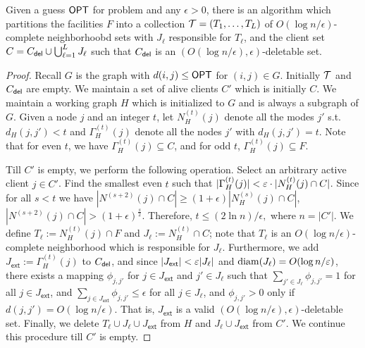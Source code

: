 \begin{theorem}\label{thm:weakdecomp}
	Given a guess $\mathsf{OPT}$ for \mckc problem and any $\epsilon>0$,  there is an algorithm which partitions the facilities $F$ into a collection ${\cal T} = (T_1,\ldots,T_L)$ of
	$O(\log n/\epsilon)$-complete neighborhoobd sets with $J_\ell$ responsible for $T_\ell$, and the client set $C = C_{\mathsf{del}} \cup \bigcup_{\ell=1}^L J_\ell$ such that
	$C_{\mathsf{del}}$ is an $(O(\log n/\epsilon),\epsilon)$-deletable set.
\end{theorem}
\begin{proof}
Recall $G$ is the graph with $d(i,j) \leq \mathsf{OPT}$ for $(i,j)\in G$. %
	Initially ${\cal T}$ and $C_{\mathsf{del}}$ are empty. We maintain a set of alive clients $C'$ which is initially $C$. We maintain a working graph $H$ which is initialized to $G$ and is always a subgraph of $G$.
	Given a node $j$ and an integer $t$, let $N^{(t)}_H(j)$ denote all the modes $j'$ s.t. $d_H(j,j') < t$ and $\Gamma^{(t)}_H(j)$ denote all the nodes $j'$ with $d_H(j,j')  = t$. 
	Note that for even $t$, we have $\Gamma^{(t)}_H(j) \subseteq C$, and for odd $t$, $\Gamma^{(t)}_H(j) \subseteq F$. 
	\smallskip
	
	
	Till $C'$ is empty, we perform the following operation. 
	Select an arbitrary active client $j\in C'$. Find the smallest even $t$ such that $|\Gamma^{(t)}_H(j)| < \varepsilon\cdot |N^{(t)}_H(j)\cap C|$. Since for all $s < t$ we have $|N^{(s+2)}(j)\cap C|\geq (1+\epsilon)|N^{(s)}_H(j)\cap C|$,  $|N^{(s+2)}(j)\cap C| > (1+\epsilon)^{\frac{s}{2}}$. Therefore,  $t \leq (2\ln n)/\epsilon,$ where $n=|C'|$. %
	We define $T_\ell := N^{(t)}_H(j) \cap F$ and $J_\ell := N^{(t)}_H \cap C$; note that $T_\ell$ is an $O(\log n/\epsilon)$-complete neighborhood which is responsible for $J_\ell$. Furthermore, we add $J_\mathsf{ext} := \Gamma^{(t)}_H(j)$ to $C_{\mathsf{del}}$, and since
	$|J_\mathsf{ext}| < \varepsilon |J_\ell|$ and $\mathrm{diam}(J_\ell) = O(\log n/\varepsilon)$, there exists a mapping $\phi_{j,j'}$ for $j\in J_\mathsf{ext}$ and $j'\in J_\ell$ such that $\sum_{j'\in J_\ell} \phi_{j,j'} = 1$ for all $j\in J_\mathsf{ext}$, and 
	$\sum_{j\in J_\mathsf{ext}} \phi_{j,j'} \leq \epsilon$ for all $j\in J_\ell$, and $\phi_{j,j'} > 0$ only if $d(j,j') = O(\log n/\epsilon)$. That is, $J_\mathsf{ext}$ is a valid $(O(\log n/\epsilon),\epsilon)$-deletable set.
	Finally, we delete $T_\ell \cup J_\ell \cup J_\mathsf{ext}$ from $H$ and $J_\ell \cup J_\mathsf{ext}$ from $C'$. We continue this procedure till $C'$ is empty. \end{proof}
